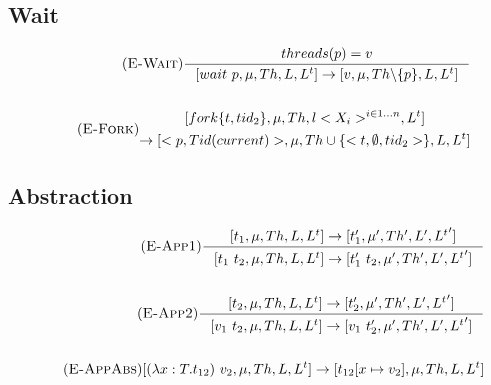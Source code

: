 \documentclass[12pt]{article}
\begin{document}
\subsection{Wait}
\begin{align*}
    \tag {\textsc{E-Wait}}
    \inference{threads(p) = v}{[wait~p,\mu,Th,L,L^t] -> [v,\mu,Th\backslash\{p\},L,L^t]}
    \\
    \\
    \tag {\textsc{E-Fork}}
    \begin{gathered}[fork\{t,tid_2\},\mu,Th, l <X_i>^{i\in1...n},L^t]\\-> [<p,Tid(current)> ,\mu, Th\cup\{<t,\emptyset,tid_2>\}, L,L^t]\end{gathered}
\end{align*}

\subsection{Abstraction}
\begin{align*}
\tag {\textsc{E-App1}}
\inference[]{[t_1,\mu,Th,L,L^t]->[t_1',\mu',Th', L',{L^t}']}{[t_1~t_2,\mu,Th,L,L^t]->[t_1'~t_2,\mu',Th', L',{L^t}']}
\\
\\
\tag {\textsc{E-App2}}
\inference[]{[t_2,\mu,Th,L,L^t]->[t_2',\mu',Th', L',{L^t}']}{[v_1~t_2,\mu,Th,L,L^t]->[v_1~t_2',\mu',Th', L',{L^t}']}
\\
\\
\tag {\textsc{E-AppAbs}}
[(\lambda x:T.t_{12})~v_2,\mu,Th,L,L^t]->[t_{12}[x\mapsto v_2],\mu,Th, L,L^t]
\end{align*}
\end{document}
